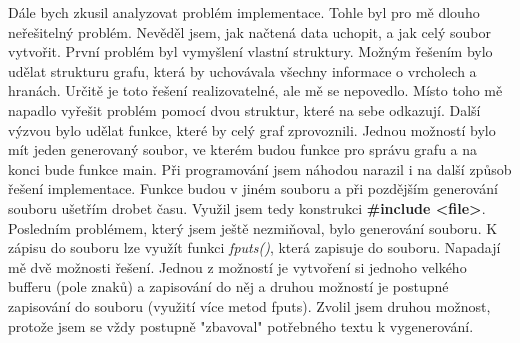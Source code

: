 \documentclass[czech,SP]{thesiskiv}
\begin{document}
{Dále bych zkusil analyzovat problém implementace. Tohle byl pro mě dlouho neřešitelný problém. Nevěděl jsem, jak načtená data uchopit, a jak celý soubor vytvořit. První problém byl vymyšlení vlastní struktury. Možným řešením bylo udělat strukturu grafu, která by uchovávala všechny informace o vrcholech a hranách. Určitě je toto řešení realizovatelné, ale mě se nepovedlo. Místo toho mě napadlo vyřešit problém pomocí dvou struktur, které na sebe odkazují. Další výzvou bylo udělat funkce, které by celý graf zprovoznili. Jednou možností bylo mít jeden generovaný soubor, ve kterém budou funkce pro správu grafu a na konci bude funkce main. Při programování jsem náhodou narazil i na další způsob řešení implementace. Funkce budou v jiném souboru a při pozdějším generování souboru ušetřím drobet času. Využil jsem tedy konstrukci \textbf{\#include <file>}.}\\
{Posledním problémem, který jsem ještě nezmiňoval, bylo generování souboru. K zápisu do souboru lze využít funkci \textit{fputs()}, která zapisuje do souboru. Napadají mě dvě možnosti řešení. Jednou z možností je vytvoření si jednoho velkého bufferu (pole znaků) a zapisování do něj a druhou možností je postupné zapisování do souboru (využití více metod fputs). Zvolil jsem druhou možnost, protože jsem se vždy postupně "zbavoval" potřebného textu k vygenerování.}
\end{document}
